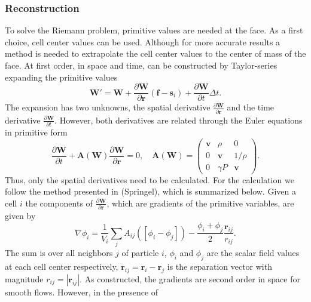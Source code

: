 \subsubsection{Reconstruction}
To solve the Riemann problem, primitive values are needed at the face. As a first
choice, cell center values can be used. Although for more accurate results a 
method is needed to extrapolate the cell center values to the center of mass of 
the face. At first order, in space and time, can be constructed by Taylor-series 
expanding the primitive values
%
\begin{equation}
	\label{eq.taylor}
	\mathbf{W}' = \mathbf{W} + \frac{\partial\mathbf{W}}{\partial\mathbf{r}}
    	(\mathbf{f}-\mathbf{s}_i) + \frac{\partial\mathbf{W}}
        {\partial t}{\Delta t}.
\end{equation}
%
The expansion has two unknowns, the spatial derivative
$\frac{\partial\mathbf{W}}{\partial \mathbf{r}}$ and the time derivative
$\frac{\partial\mathbf{W}}{\partial t}$. However, both derivatives
are related through the Euler equations in primitive form
%
\begin{equation}
    \frac{\partial\mathbf{W}}{\partial t}  + \mathbf{A}
    	(\mathbf{W})\frac{\partial\mathbf{W}}{\partial\mathbf{r}} = 0,
    \quad
    \mathbf{A}(\mathbf{W}) =
    \left(
    \begin{array}{ccc}
        \mathbf{v} & \rho & 0 \\
        0 & \mathbf{v} & 1/\rho \\
        0 & \gamma P & \mathbf{v}
    \end{array}
    \right).
\end{equation}
%
Thus, only the spatial derivatives need to be calculated. For the
calculation we follow the method presented in (Springel), which is
summarized below. Given a cell $i$ the components of 
$\frac{\partial\mathbf{W}}{\partial \mathbf{r}}$, which are gradients
of the primitive variables, are given by
%
\begin{equation}
	\nabla\phi_i = \frac{1}{V_i}\sum_{j}A_{ij}
    	\left(\left[\phi_i - \phi_j\right]\right) -
        \frac{\phi_i + \phi_j}{2}
        \frac{\mathbf{r}_{ij}}{r_{ij}}.
\end{equation}
%
The sum is over all neighbors $j$ of particle $i$, $\phi_i$ and
$\phi_j$ are the scalar field values at each cell center respectively,
$\mathbf{r}_{ij} = \mathbf{r}_i - \mathbf{r}_j$ is the separation vector
with magnitude $r_{ij} =|\mathbf{r}_{ij}|$. As constructed, the gradients
are second order in space for smooth flows. However, in the presence of
